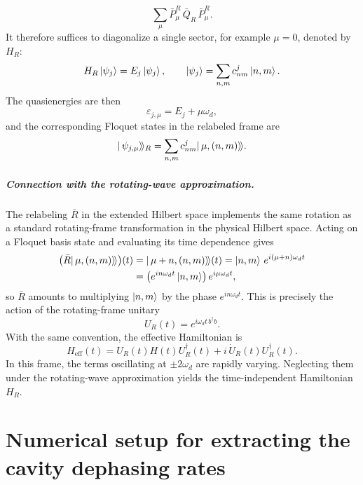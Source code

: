 \begin{appendices}
\begin{equation}
    \sum_\mu \bar P_\mu^{R}\,\bar Q_R\,\bar P_\mu^{R}.
\end{equation}
It therefore suffices to diagonalize a single sector, for example $\mu=0$, denoted by $H_R$:
\begin{equation}
    H_R\ket{\psi_j}=E_j\ket{\psi_j},
    \qquad
    \ket{\psi_j}=\sum_{n,m}c_{nm}^j\ket{n,m}.
\end{equation}
The quasienergies are then
\begin{equation}
    \varepsilon_{j,\mu}=E_j+\mu\omega_d,
\end{equation}
and the corresponding Floquet states in the relabeled frame are
\begin{equation}
    |\,\psi_{j,\mu}\rangle\!\rangle_{R}=\sum_{n,m}c_{nm}^j|\,\mu,(n,m)\rangle\!\rangle.
\end{equation}

\paragraph{Connection with the rotating-wave approximation.}
The relabeling $\bar R$ in the extended Hilbert space implements the same rotation as a standard rotating-frame transformation in the physical Hilbert space. Acting on a Floquet basis state and evaluating its time dependence gives
\begin{align}
    \bigl(\bar R|\,\mu,(n,m)\rangle\!\rangle\bigr)(t)
    &= |\,\mu+n,(n,m)\rangle\!\rangle(t)
     = \ket{n,m}\,e^{i(\mu+n)\omega_d t} \nonumber\\
    &= \bigl(e^{in\omega_d t}\ket{n,m}\bigr)\,e^{i\mu\omega_d t},
\end{align}
so $\bar R$ amounts to multiplying $\ket{n,m}$ by the phase $e^{in\omega_d t}$. This is precisely the action of the rotating-frame unitary
\begin{equation}
    U_R(t)=e^{i\omega_d t\, b^\dagger b}.
\end{equation}
With the same convention, the effective Hamiltonian is
\begin{equation}
    H_{\mathrm{eff}}(t)=U_R(t)H(t)U_R^\dagger(t)+i\,\dot U_R(t)U_R^\dagger(t).
\end{equation}
In this frame, the terms oscillating at $\pm 2\omega_d$ are rapidly varying. Neglecting them under the rotating-wave approximation yields the time-independent Hamiltonian $H_R$.

\chapter{Numerical setup for extracting the cavity dephasing rates}
\label{Numerical details of obtaining the cavity dephasing rates}


\end{appendices}
